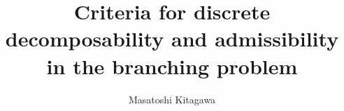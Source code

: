 \documentclass[a4paper]{article}
\begin{document}
\title{Criteria for discrete decomposability and admissibility in the branching problem}

\author{Masatoshi Kitagawa}

\date{}

\maketitle















% 

\end{document}
